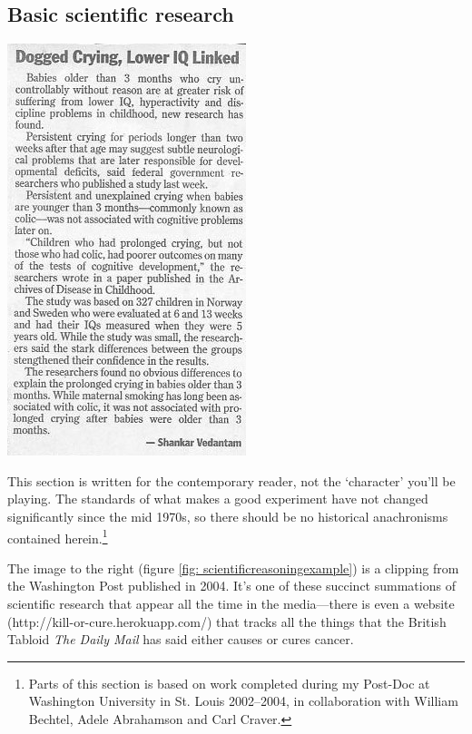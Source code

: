 \begin{refsection}
\subsection{Basic scientific research}
\label{basicscientificresearch}

\begin{marginfigure}
 \begin{center}


     \includegraphics[scale=0.50]{../images/scientificReasoning2.jpg}
\end{center}
 \caption{ ~\citep{Vedantam:2004tz}}
\label{fig: scientificreasoningexample}
\end{marginfigure}

This section is written for the contemporary reader, not the `character' you'll be playing. The standards of what makes a good experiment have not changed significantly since the mid 1970s, so there should be no historical anachronisms contained herein.\footnote{Parts of this section is based on work completed during my Post-Doc at Washington University in St. Louis 2002--2004, in collaboration with William Bechtel, Adele Abrahamson and Carl Craver.}

The image to the right (figure \ref{fig: scientificreasoningexample}) is a clipping from the Washington Post published in 2004. It's one of these succinct summations of scientific research that appear all the time in the media---there is even a website (http:\slash \slash kill-or-cure.herokuapp.com\slash ) that tracks all the things that the British Tabloid \emph{The Daily Mail} has said either causes or cures cancer.


\end{refsection}
